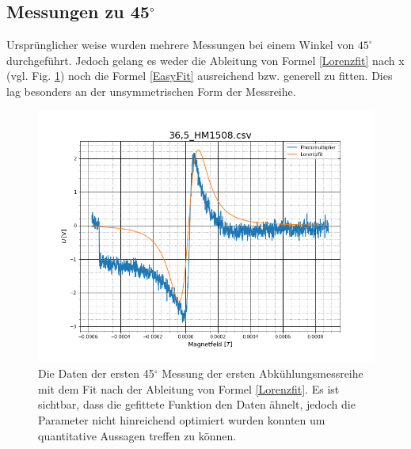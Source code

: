 \subsection{Messungen zu 45$^\circ$}
Ursprünglicher weise wurden mehrere Messungen bei einem Winkel von $45^\circ$ durchgeführt. Jedoch gelang es weder die Ableitung von Formel \ref{Lorenzfit} nach x (vgl. Fig. \ref{45deg}) noch die Formel \ref{EasyFit} ausreichend bzw. generell zu fitten. Dies lag besonders an der unsymmetrischen Form der Messreihe.
\begin{figure}[ht]
	\includegraphics[scale=0.5]{Bild/45_fit}
	\centering
	\caption[Druck zu Lebensdauer Fit für eine Beliebige 45$\circ$ Messung]{Die Daten der ersten 45$^\circ$ Messung der ersten Abkühlungsmessreihe mit dem Fit nach der Ableitung von Formel \ref{Lorenzfit}. Es ist sichtbar, dass die gefittete Funktion den Daten ähnelt, jedoch die Parameter nicht hinreichend optimiert wurden konnten um quantitative Aussagen treffen zu können.}
	\label{45deg}
\end{figure}